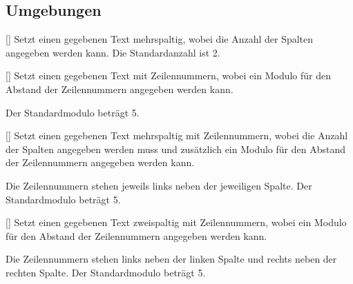 \subsection{Umgebungen}
\begin{environments}

	[]
		Setzt einen gegebenen Text mehrspaltig, wobei die Anzahl der
		Spalten angegeben werden kann. Die Standardanzahl ist 2.
\begin{example}
  \begin{mehrspaltig}
    \blindtext
  \end{mehrspaltig}
\end{example}
\resetZeilenNr
	[]
		Setzt einen gegebenen Text mit Zeilennummern, wobei
		ein	Modulo für den Abstand der Zeilennummern angegeben werden
		kann.
		
		Der Standardmodulo beträgt 5.
\begin{example}[outside=true]
  \begin{zeilenNr}[1]
    \blindtext
  \end{zeilenNr}
\end{example}
\resetZeilenNr

	[]
		Setzt einen gegebenen Text mehrspaltig mit Zeilennummern, 
		wobei die Anzahl der Spalten angegeben werden muss und 
		zusätzlich ein Modulo für den Abstand der Zeilennummern
		angegeben werden kann.
		
		Die Zeilennummern stehen jeweils links neben der jeweiligen
		Spalte.	Der Standardmodulo beträgt 5.
\begin{example}[outside=true]
  \begin{zeilenNrMehrspaltig}[5]{3}
    \blindtext
  \end{zeilenNrMehrspaltig}
\end{example}
\resetZeilenNr

	[]
		Setzt einen gegebenen Text zweispaltig mit Zeilennummern,
		wobei ein Modulo für den Abstand der Zeilennummern angegeben
		werden kann.
		
		Die Zeilennummern stehen links neben der linken Spalte und
		rechts neben der rechten Spalte. Der Standardmodulo beträgt 5.
		
\begin{example}[outside=true]
  \begin{zeilenNrZweispaltig}[3]
    \blindtext
  \end{zeilenNrZweispaltig}
\end{example}
\resetZeilenNr
\end{environments}
